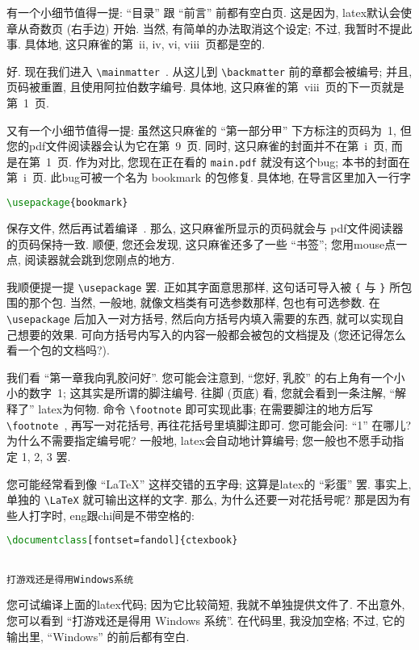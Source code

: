 有一个小细节值得一提: ``目录'' 跟 ``前言'' 前都有空白页.
这是因为, \gls{latex}默认会使章从奇数页 (右手边) 开始.
当然, 有简单的办法取消这个设定;
不过, 我暂时不提此事.
具体地, 这只麻雀的第~ii, iv, vi, viii~页都是空的.

好.
现在我们进入 \verb`\mainmatter`~.
从这儿到 \verb`\backmatter` 前的章都会被编号;
并且, 页码被重置, 且使用阿拉伯数字编号.
具体地, 这只麻雀的第~viii~页的下一页就是第~1~页.

又有一个小细节值得一提:
虽然这只麻雀的 ``第一部分\quad 甲'' 下方标注的页码为~1,
但您的\gls{pdf}文件阅读器会认为它在第~9~页.
同时, 这只麻雀的封面并不在第~i~页, 而是在第~1~页.
作为对比, 您现在正在看的 \verb`main.pdf` 就没有这个\gls{bug};
本书的封面在第~i~页.
此\gls{bug}可被一个名为 \textsf{bookmark} 的包修复.
具体地, 在导言区里加入一行字
\begin{lstlisting}[language=TeX]
\usepackage{bookmark}
\end{lstlisting}
保存文件, 然后再试着编译~.
那么, 这只麻雀所显示的页码就会与%
\gls{pdf}文件阅读器的页码保持一致.
顺便, 您还会发现, 这只麻雀还多了一些 ``书签'';
您用\gls{mouse}点一点,
阅读器就会跳到您刚点的地方.

我顺便提一提 \verb`\usepackage` 罢.
正如其字面意思那样,
这句话可导入被 \verb`{` 与 \verb`}` 所包围的那个包.
当然, 一般地, 就像文档类有可选参数那样, 包也有可选参数.
在 \verb`\usepackage` 后加入一对方括号,
然后向方括号内填入需要的东西,
就可以实现自己想要的效果.
可向方括号内写入的内容一般都会被包的文档提及
(您还记得怎么看一个包的文档吗?).

我们看 ``第一章\quad 我向乳胶问好''.
您可能会注意到, ``您好, 乳胶'' 的右上角有一个小小的数字~1;
这其实是所谓的脚注编号. 往脚 (页底) 看, 您就会看到一条注解,
``解释了'' \gls{latex}为何物.
命令 \verb`\footnote` 即可实现此事;
在需要脚注的地方后写 \verb`\footnote`~,
再写一对花括号, 再往花括号里填脚注即可.
您可能会问:
``1'' 在哪儿?
为什么不需要指定编号呢?
一般地, \gls{latex}会自动地计算编号;
您一般也不愿手动指定 1, 2, 3 罢.

您可能经常看到像 ``\LaTeX{}'' 这样交错的五字母;
这算是\gls{latex}的 ``彩蛋'' 罢.
事实上, 单独的 \verb`\LaTeX` 就可输出这样的文字.
那么, 为什么还要一对花括号呢?
那是因为有些人打字时, \gls{eng}跟\gls{chi}间是不带空格的:
\begin{lstlisting}[language=TeX]
\documentclass[fontset=fandol]{ctexbook}


打游戏还是得用Windows系统

\end{lstlisting}
您可试编译上面的\gls{latex}代码;
因为它比较简短, 我就不单独提供文件了.
不出意外, 您可以看到 ``打游戏还是得用 Windows 系统''.
在代码里, 我没加空格;
不过, 它的输出里, ``Windows'' 的前后都有空白.

